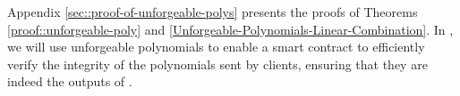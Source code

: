 %
%



\vspace{-1.2mm}

Appendix \ref{sec::proof-of-unforgeable-polys} presents the proofs of Theorems \ref{proof::unforgeable-poly} and \ref{Unforgeable-Polynomials-Linear-Combination}. In \withFai, we will use unforgeable polynomials to enable a smart contract to efficiently verify the integrity of the polynomials sent by clients, ensuring that they are indeed the outputs of \vopr.








